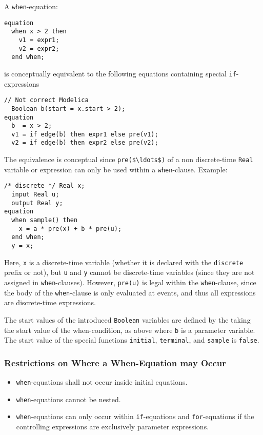 A \lstinline!when!-equation:
\begin{lstlisting}[language=modelica]
equation
  when x > 2 then
    v1 = expr1;
    v2 = expr2;
  end when;
\end{lstlisting}
is conceptually equivalent to the following equations containing special \lstinline!if!-expressions
\begin{lstlisting}[language=modelica]
  // Not correct Modelica
  Boolean b(start = x.start > 2);
equation
  b  = x > 2;
  v1 = if edge(b) then expr1 else pre(v1);
  v2 = if edge(b) then expr2 else pre(v2);
\end{lstlisting}

\begin{nonnormative}
The equivalence is conceptual since \lstinline!pre($\ldots$)! of a non discrete-time \lstinline!Real! variable or expression can only be used within a \lstinline!when!-clause.  Example:
\begin{lstlisting}[language=modelica]
  /* discrete */ Real x;
  input Real u;
  output Real y;
equation
  when sample() then
    x = a * pre(x) + b * pre(u);
  end when;
  y = x;
\end{lstlisting}

Here, \lstinline!x! is a discrete-time variable (whether it is declared with the \lstinline!discrete! prefix or not), but \lstinline!u! and \lstinline!y! cannot be discrete-time variables
(since they are not assigned in \lstinline!when!-clauses).  However, \lstinline!pre(u)! is legal within the \lstinline!when!-clause, since the body of the \lstinline!when!-clause is only evaluated at events, and thus all expressions
are discrete-time expressions.
\end{nonnormative}

The start values of the introduced \lstinline!Boolean! variables are defined by the taking the start value of the when-condition, as above where \lstinline!b! is a parameter
variable.
The start value of the special functions \lstinline!initial!, \lstinline!terminal!, and \lstinline!sample! is \lstinline!false!.

\subsubsection{Restrictions on Where a When-Equation may Occur}\label{restrictions-on-where-a-when-equation-may-occur}

\begin{itemize}
\item
  \lstinline!when!-equations shall not occur inside initial equations.
\item
  \lstinline!when!-equations cannot be nested.
\item
  \lstinline!when!-equations can only occur within \lstinline!if!-equations and \lstinline!for!-equations if the controlling expressions are exclusively parameter expressions.
\end{itemize}

